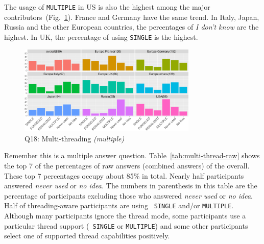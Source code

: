 \documentclass[preprint,5p,times]{elsarticle}
\def\myquote#1{{\it #1}}
\def\mcountries{major contributors}%
\begin{document}
The usage of {\tt MULTIPLE} in US is also the highest among the
\mcountries\  (Fig.~\ref{fig:multi-thread}). France and Germany have
the same trend. In Italy, Japan, Russia and the
other European countries, the percentages of \myquote{I don't know}
are the highest. In UK, the percentage of using {\tt SINGLE} is the
highest.

\begin{figure}[htb]
  \begin{center}
    \includegraphics[width=8.5cm]{R-scripts/Q18.pdf}
    \caption{Q18: Multi-threading {\it(multiple)}}
    \label{fig:multi-thread}
  \end{center}
\end{figure}

Remember this is a multiple answer
question. Table~\ref{tab:multi-thread-raw} shows the top 7 of the
percentages of raw answers (combined answers) of the
overall. These top 7 percentages occupy about 85\% in
total. Nearly half
participants answered \myquote{never used} or \myquote{no idea.} The
numbers in parenthesis in this table are the percentage of
participants excluding those who answered \myquote{never used} or
\myquote{no idea}. Half of threading-aware participants are using {\tt
  SINGLE}
and/or {\tt MULTIPLE}. Although many participants ignore the thread
mode, some participants use a particular thread support ({\tt
  SINGLE} or {\tt MULTIPLE}) and some other participants select one of
supported thread capabilities positively.
\end{document}

